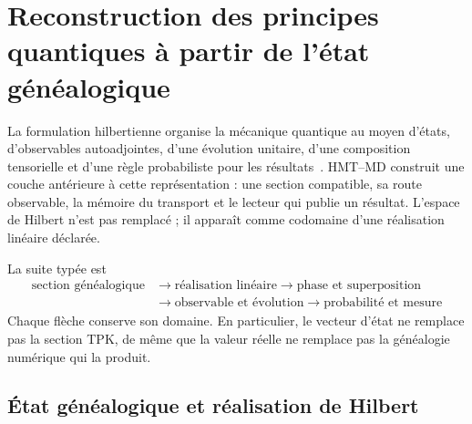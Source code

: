 \section{Reconstruction des principes quantiques à partir de l’état généalogique}
\label{v:v:rec:sec:postulados-cuanticos-genealogicos-rev2}

La formulation hilbertienne organise la mécanique quantique au moyen d’états,
d’observables autoadjointes, d’une évolution unitaire, d’une composition tensorielle et d’une
règle probabiliste pour les résultats~\cite{v:vonNeumann1932}. HMT--MD
construit une couche antérieure à cette représentation : une section compatible,
sa route observable, la mémoire du transport et le lecteur qui publie un
résultat. L’espace de Hilbert n’est pas remplacé ; il apparaît comme codomaine d’une
réalisation linéaire déclarée.

La suite typée est
\[
 \boxed{\begin{aligned}
 \text{section généalogique}
 &\longrightarrow \text{réalisation linéaire}
 \longrightarrow \text{phase et superposition}\\
 &\longrightarrow \text{observable et évolution}
 \longrightarrow \text{probabilité et mesure}
 \end{aligned}}
\]
Chaque flèche conserve son domaine. En particulier, le vecteur d’état ne
remplace pas la section TPK, de même que la valeur réelle ne remplace pas
la généalogie numérique qui la produit.

\subsection{État généalogique et réalisation de Hilbert}
\label{v:v:rec:realizacion_evolucion:section:02}

